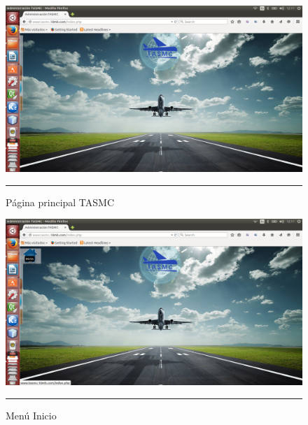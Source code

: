 \begin{figure}[h!]
	\centering
		\includegraphics[width=1\textwidth]{Figuras/index.png}
		\rule{35em}{0.5pt}
	\caption[Página principal TASMC]{Página principal TASMC}
	\label{fig:indexWeb}
\end{figure}
\begin{figure}[h!]
	\centering
		\includegraphics[width=1\textwidth]{Figuras/indexhome.png}
		\rule{35em}{0.5pt}
	\caption[Menú Inicio]{Menú Inicio}
	\label{fig:menuInicio}
\end{figure}
\clearpage


